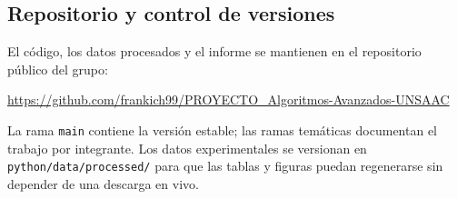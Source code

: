 \subsection{Repositorio y control de versiones}
El código, los datos procesados y el informe se mantienen en el repositorio público del grupo:
\begin{center}
    \url{https://github.com/frankich99/PROYECTO_Algoritmos-Avanzados-UNSAAC}
\end{center}
La rama \texttt{main} contiene la versión estable; las ramas temáticas documentan el trabajo por integrante. Los datos experimentales se versionan en \texttt{python/data/processed/} para que las tablas y figuras puedan regenerarse sin depender de una descarga en vivo.
